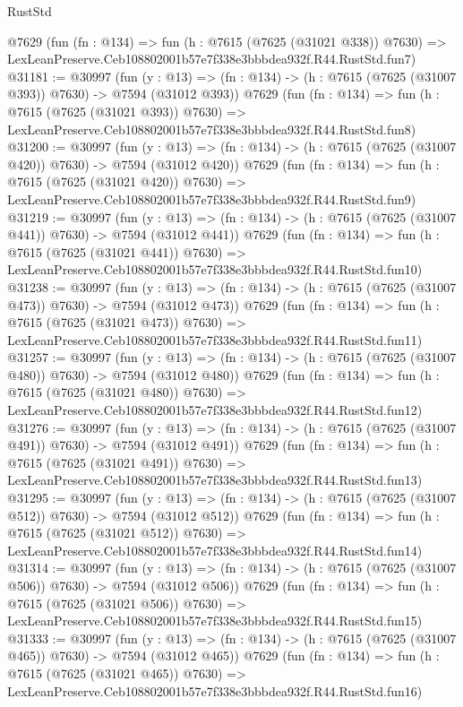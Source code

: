 \begin{lexlean}{RustStd}
\begin{coremodule}
    @7629
    (fun (fn : @134) =>
    fun (h : @7615 (@7625 (@31021 @338)) @7630) =>
    LexLeanPreserve.Ceb108802001b57e7f338e3bbbdea932f.R44.RustStd.fun7)
@31181 := @30997
    (fun (y : @13) => (fn : @134) -> (h : @7615 (@7625 (@31007 @393)) @7630) -> @7594 (@31012 @393))
    @7629
    (fun (fn : @134) =>
    fun (h : @7615 (@7625 (@31021 @393)) @7630) =>
    LexLeanPreserve.Ceb108802001b57e7f338e3bbbdea932f.R44.RustStd.fun8)
@31200 := @30997
    (fun (y : @13) => (fn : @134) -> (h : @7615 (@7625 (@31007 @420)) @7630) -> @7594 (@31012 @420))
    @7629
    (fun (fn : @134) =>
    fun (h : @7615 (@7625 (@31021 @420)) @7630) =>
    LexLeanPreserve.Ceb108802001b57e7f338e3bbbdea932f.R44.RustStd.fun9)
@31219 := @30997
    (fun (y : @13) => (fn : @134) -> (h : @7615 (@7625 (@31007 @441)) @7630) -> @7594 (@31012 @441))
    @7629
    (fun (fn : @134) =>
    fun (h : @7615 (@7625 (@31021 @441)) @7630) =>
    LexLeanPreserve.Ceb108802001b57e7f338e3bbbdea932f.R44.RustStd.fun10)
@31238 := @30997
    (fun (y : @13) => (fn : @134) -> (h : @7615 (@7625 (@31007 @473)) @7630) -> @7594 (@31012 @473))
    @7629
    (fun (fn : @134) =>
    fun (h : @7615 (@7625 (@31021 @473)) @7630) =>
    LexLeanPreserve.Ceb108802001b57e7f338e3bbbdea932f.R44.RustStd.fun11)
@31257 := @30997
    (fun (y : @13) => (fn : @134) -> (h : @7615 (@7625 (@31007 @480)) @7630) -> @7594 (@31012 @480))
    @7629
    (fun (fn : @134) =>
    fun (h : @7615 (@7625 (@31021 @480)) @7630) =>
    LexLeanPreserve.Ceb108802001b57e7f338e3bbbdea932f.R44.RustStd.fun12)
@31276 := @30997
    (fun (y : @13) => (fn : @134) -> (h : @7615 (@7625 (@31007 @491)) @7630) -> @7594 (@31012 @491))
    @7629
    (fun (fn : @134) =>
    fun (h : @7615 (@7625 (@31021 @491)) @7630) =>
    LexLeanPreserve.Ceb108802001b57e7f338e3bbbdea932f.R44.RustStd.fun13)
@31295 := @30997
    (fun (y : @13) => (fn : @134) -> (h : @7615 (@7625 (@31007 @512)) @7630) -> @7594 (@31012 @512))
    @7629
    (fun (fn : @134) =>
    fun (h : @7615 (@7625 (@31021 @512)) @7630) =>
    LexLeanPreserve.Ceb108802001b57e7f338e3bbbdea932f.R44.RustStd.fun14)
@31314 := @30997
    (fun (y : @13) => (fn : @134) -> (h : @7615 (@7625 (@31007 @506)) @7630) -> @7594 (@31012 @506))
    @7629
    (fun (fn : @134) =>
    fun (h : @7615 (@7625 (@31021 @506)) @7630) =>
    LexLeanPreserve.Ceb108802001b57e7f338e3bbbdea932f.R44.RustStd.fun15)
@31333 := @30997
    (fun (y : @13) => (fn : @134) -> (h : @7615 (@7625 (@31007 @465)) @7630) -> @7594 (@31012 @465))
    @7629
    (fun (fn : @134) =>
    fun (h : @7615 (@7625 (@31021 @465)) @7630) =>
    LexLeanPreserve.Ceb108802001b57e7f338e3bbbdea932f.R44.RustStd.fun16)

\end{coremodule}
\end{lexlean}
